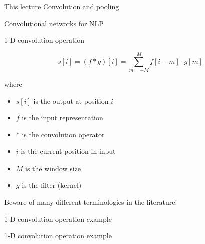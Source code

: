 \documentclass[12pt]{beamer}
\begin{document}
\begin{frame}{This lecture}
Convolution and pooling

Convolutional networks for NLP
\end{frame}

\begin{frame}{1-D convolution operation}
	
	$$
	s[i] = (f * g) [i] = \sum_{m = -M}^{M} f[i - m] \cdot g[m]
	$$
	
	where
	
	\begin{itemize}
		\item $s[i]$ is the output at position $i$
		\item $f$ is the input representation
		\item $*$ is the convolution operator
		\item $i$ is the current position in input
		\item $M$ is the window size
		\item $g$ is the filter (kernel)
	\end{itemize}
	
	Beware of many different terminologies in the literature!
	
\end{frame}


\begin{frame}[fragile]{1-D convolution operation example}
	
	
	
\end{frame}

\begin{frame}{1-D convolution operation example}
	
	
	
	
	
	
\end{frame}
\end{document}
